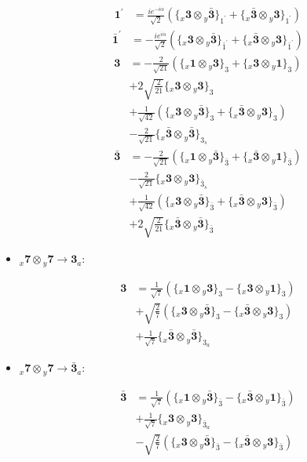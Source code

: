 \documentclass[english]{article}
\newcommand{\rep}[1]{\mathbf{#1}}
\newcommand{\repx}[2]{{}_{#2}\mathbf{#1}}
\newcommand{\tsprodx}[2]{\repx{#1}{x}\otimes\repx{#2}{y}}
\newcommand{\subcgt}[3]{\big\{ \tsprodx{#1}{#2}\big\}^{}_{#3}}
\begin{document}
\begin{itemize}
\begin{fleqn}
\begin{align*}
\rep{1^{\prime}} & = \frac{i e^{-i \alpha }}{\sqrt{2}}\left(\subcgt{3}{\bar{3}}{1^{\prime}}+\subcgt{\bar{3}}{3}{1^{\prime}}\right)
\end{align*}
\begin{align*}
\rep{\bar{1}^{\prime}} & = -\frac{i e^{i \alpha }}{\sqrt{2}}\left(\subcgt{3}{\bar{3}}{\bar{1}^{\prime}}+\subcgt{\bar{3}}{3}{\bar{1}^{\prime}}\right)
\end{align*}
\begin{align*}
\rep{3} & = -\frac{2}{\sqrt{21}}\left(\subcgt{1}{3}{3}+\subcgt{3}{1}{3}\right) \\ 
 & +2 \sqrt{\frac{2}{21}}\subcgt{3}{3}{3} \\ 
 & +\frac{1}{\sqrt{42}}\left(\subcgt{3}{\bar{3}}{3}+\subcgt{\bar{3}}{3}{3}\right) \\ 
 & -\frac{2}{\sqrt{21}}\subcgt{\bar{3}}{\bar{3}}{3_{s}}
\end{align*}
\begin{align*}
\rep{\bar{3}} & = -\frac{2}{\sqrt{21}}\left(\subcgt{1}{\bar{3}}{\bar{3}}+\subcgt{\bar{3}}{1}{\bar{3}}\right) \\ 
 & -\frac{2}{\sqrt{21}}\subcgt{3}{3}{\bar{3}_{s}} \\ 
 & +\frac{1}{\sqrt{42}}\left(\subcgt{3}{\bar{3}}{\bar{3}}+\subcgt{\bar{3}}{3}{\bar{3}}\right) \\ 
 & +2 \sqrt{\frac{2}{21}}\subcgt{\bar{3}}{\bar{3}}{\bar{3}}
\end{align*}
\end{fleqn}
\item $\tsprodx{7}{7}\to\rep{3}_{a}$:
\begin{fleqn}
\begin{align*}
\rep{3} & = \frac{1}{\sqrt{7}}\left(\subcgt{1}{3}{3}-\subcgt{3}{1}{3}\right) \\ 
 & +\sqrt{\frac{2}{7}}\left(\subcgt{3}{\bar{3}}{3}-\subcgt{\bar{3}}{3}{3}\right) \\ 
 & +\frac{1}{\sqrt{7}}\subcgt{\bar{3}}{\bar{3}}{3_{a}}
\end{align*}
\end{fleqn}
\item $\tsprodx{7}{7}\to\rep{\bar{3}}_{a}$:
\begin{fleqn}
\begin{align*}
\rep{\bar{3}} & = \frac{1}{\sqrt{7}}\left(\subcgt{1}{\bar{3}}{\bar{3}}-\subcgt{\bar{3}}{1}{\bar{3}}\right) \\ 
 & +\frac{1}{\sqrt{7}}\subcgt{3}{3}{\bar{3}_{a}} \\ 
 & -\sqrt{\frac{2}{7}}\left(\subcgt{3}{\bar{3}}{\bar{3}}-\subcgt{\bar{3}}{3}{\bar{3}}\right)

\end{align*}
\end{fleqn}
\end{itemize}
\end{document}
